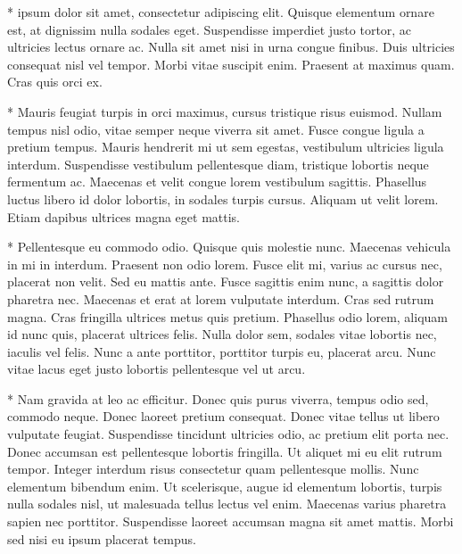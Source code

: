 \documentclass{article}
\begin{document}
\Xinplaceofnumber[A]{0pt}
\Xinplaceoflemmaseparator{0pt}%
\Xlemmaseparator[A]{:}
\setmsdatalabel{}
\newcommand{\mymsdata}[1]{*\msdata{#1}\ledsidenote{*#1}}
\beginnumbering
\autopar



\mymsdata{A} ipsum dolor sit amet, consectetur adipiscing elit. Quisque elementum ornare est, at dignissim nulla sodales eget. Suspendisse imperdiet justo tortor, ac ultricies lectus ornare ac. Nulla sit amet nisi in urna congue finibus. Duis ultricies consequat nisl vel tempor. Morbi vitae suscipit enim. Praesent at maximus quam. Cras quis orci ex.\stopmsdata


\mymsdata{\textbf{B}}  Mauris feugiat turpis in orci maximus, cursus tristique risus euismod. Nullam tempus nisl odio, vitae semper neque viverra sit amet. Fusce congue ligula a pretium tempus. Mauris hendrerit mi ut sem egestas, vestibulum ultricies ligula interdum. Suspendisse vestibulum pellentesque diam, tristique lobortis neque fermentum ac. Maecenas et velit congue lorem vestibulum sagittis. Phasellus luctus libero id dolor lobortis, in sodales turpis cursus. Aliquam ut velit lorem. Etiam dapibus ultrices magna eget mattis.\stopmsdata


\mymsdata{C}  Pellentesque eu commodo odio. Quisque quis molestie nunc. Maecenas vehicula in mi in interdum. Praesent non odio lorem. Fusce elit mi, varius ac cursus nec, placerat non velit. Sed eu mattis ante. Fusce sagittis enim nunc, a sagittis dolor pharetra nec. Maecenas et erat at lorem vulputate interdum. Cras sed rutrum magna. Cras fringilla ultrices metus quis pretium. Phasellus odio lorem, aliquam id nunc quis, placerat ultrices felis. Nulla dolor sem, sodales vitae lobortis nec, iaculis vel felis. Nunc a ante porttitor, porttitor turpis eu, placerat arcu. Nunc vitae lacus eget justo lobortis pellentesque vel ut arcu.\stopmsdata


\mymsdata{D}  Nam gravida at leo ac efficitur. Donec quis purus viverra, tempus odio sed, commodo neque. Donec laoreet pretium consequat. Donec vitae tellus ut libero vulputate feugiat. Suspendisse tincidunt ultricies odio, ac pretium elit porta nec. Donec accumsan est pellentesque lobortis fringilla. Ut aliquet mi eu elit rutrum tempor. Integer interdum risus consectetur quam pellentesque mollis. Nunc elementum bibendum enim. Ut scelerisque, augue id elementum lobortis, turpis nulla sodales nisl, ut malesuada tellus lectus vel enim. Maecenas varius pharetra sapien nec porttitor. Suspendisse laoreet accumsan magna sit amet mattis. Morbi sed nisi eu ipsum placerat tempus.\stopmsdata
\end{document}
